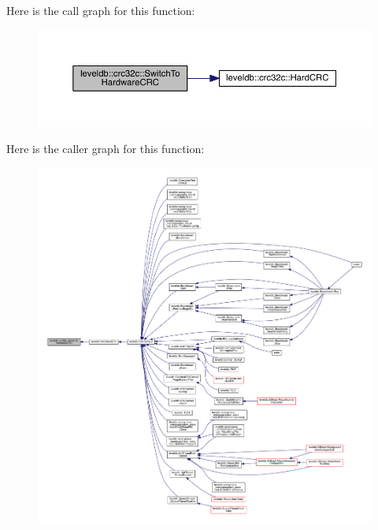 Here is the call graph for this function\+:\nopagebreak
\begin{figure}[H]
\begin{center}
\leavevmode
\includegraphics[width=350pt]{namespaceleveldb_1_1crc32c_a40ed6712b2d979e093735134e9fbd4b5_cgraph}
\end{center}
\end{figure}




Here is the caller graph for this function\+:
\nopagebreak
\begin{figure}[H]
\begin{center}
\leavevmode
\includegraphics[width=350pt]{namespaceleveldb_1_1crc32c_a40ed6712b2d979e093735134e9fbd4b5_icgraph}
\end{center}
\end{figure}


\hypertarget{namespaceleveldb_1_1crc32c_a2ef79d6b85c2866295c1573ea6e62a52}{}
